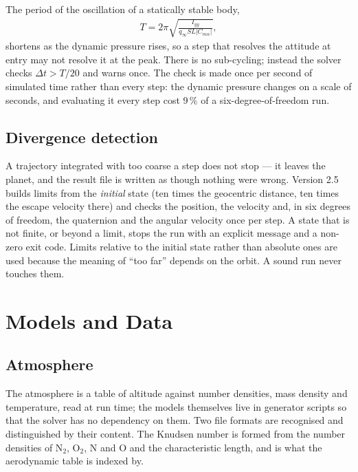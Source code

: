 \documentclass[11pt,a4paper]{article}
\begin{document}
The period of the oscillation of a statically stable body,
%
\begin{align}
	T = 2 \pi \sqrt{ \frac{I_{yy}}{ q_{\infty} S L \left| C_{m\alpha} \right| } } ,
	\label{period}
\end{align}
%
shortens as the dynamic pressure rises, so a step that resolves the attitude at entry may
not resolve it at the peak. There is no sub-cycling; instead the solver checks
$\Delta t > T/20$ and warns once. The check is made once per second of simulated time
rather than every step: the dynamic pressure changes on a scale of seconds, and evaluating
it every step cost 9\,\% of a six-degree-of-freedom run.

\subsection{Divergence detection}

A trajectory integrated with too coarse a step does not stop --- it leaves the planet, and
the result file is written as though nothing were wrong. Version 2.5 builds limits from
the \emph{initial} state (ten times the geocentric distance, ten times the escape velocity
there) and checks the position, the velocity and, in six degrees of freedom, the
quaternion and the angular velocity once per step. A state that is not finite, or beyond a
limit, stops the run with an explicit message and a non-zero exit code. Limits relative to
the initial state rather than absolute ones are used because the meaning of ``too far''
depends on the orbit. A sound run never touches them.

\section{Models and Data}

\subsection{Atmosphere}

The atmosphere is a table of altitude against number densities, mass density and
temperature, read at run time; the models themselves live in generator scripts so that the
solver has no dependency on them. Two file formats are recognised and distinguished by
their content. The Knudsen number is formed from the number densities of N$_2$, O$_2$,
N and O and the characteristic length, and is what the aerodynamic table is indexed by.
\end{document}
